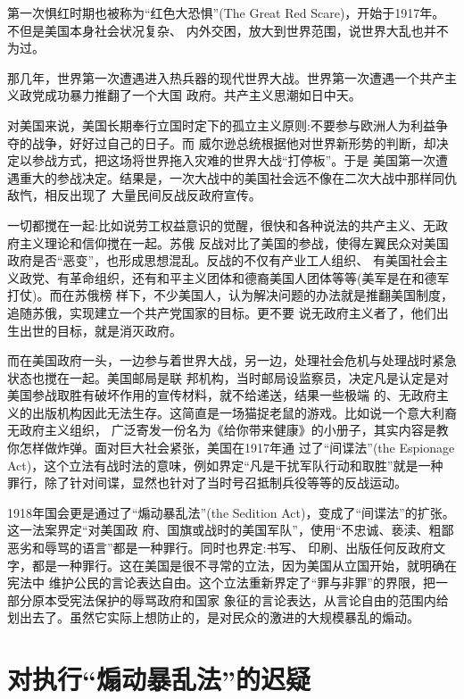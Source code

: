 \documentclass[10pt]{article}
\begin{document}
{第一次惧红时期也被称为``红色大恐惧''(The Great Red Scare)，开始于1917年。不但是美国本身社会状况复杂、
内外交困，放大到世界范围，说世界大乱也并不为过。

那几年，世界第一次遭遇进入热兵器的现代世界大战。世界第一次遭遇一个共产主义政党成功暴力推翻了一个大国
政府。共产主义思潮如日中天。

对美国来说，美国长期奉行立国时定下的孤立主义原则:不要参与欧洲人为利益争夺的战争，好好过自己的日子。而
威尔逊总统根据他对世界新形势的判断，却决定以参战方式，把这场将世界拖入灾难的世界大战``打停板''。于是
美国第一次遭遇重大的参战决定。结果是，一次大战中的美国社会远不像在二次大战中那样同仇敌忾，相反出现了
大量民间反战反政府宣传。

一切都搅在一起:比如说劳工权益意识的觉醒，很快和各种说法的共产主义、无政府主义理论和信仰搅在一起。苏俄
反战对比了美国的参战，使得左翼民众对美国政府是否``恶变''，也形成思想混乱。反战的不仅有产业工人组织、
有美国社会主义政党、有革命组织，还有和平主义团体和德裔美国人团体等等(美军是在和德军打仗)。而在苏俄榜
样下，不少美国人，认为解决问题的办法就是推翻美国制度，追随苏俄，实现建立一个共产党国家的目标。更不要
说无政府主义者了，他们出生出世的目标，就是消灭政府。

而在美国政府一头，一边参与着世界大战，另一边，处理社会危机与处理战时紧急状态也搅在一起。美国邮局是联
邦机构，当时邮局设监察员，决定凡是认定是对美国参战取胜有破坏作用的宣传材料，就不给递送，结果一些极端
的、无政府主义的出版机构因此无法生存。这简直是一场猫捉老鼠的游戏。比如说一个意大利裔无政府主义组织，
广泛寄发一份名为《给你带来健康》的小册子，其实内容是教你怎样做炸弹。面对巨大社会紧张，美国在1917年通
过了``间谍法''(the Espionage Act)，这个立法有战时法的意味，例如界定``凡是干扰军队行动和取胜''就是一种
罪行，除了针对间谍，显然也针对了当时号召抵制兵役等等的反战运动。

1918年国会更是通过了``煽动暴乱法''(the Sedition Act)，变成了``间谍法''的扩张。这一法案界定``对美国政
府、国旗或战时的美国军队''，使用``不忠诚、亵渎、粗鄙恶劣和辱骂的语言''都是一种罪行。同时也界定:书写、
印刷、出版任何反政府文字，都是一种罪行。这在美国是很不寻常的立法，因为美国从立国开始，就明确在宪法中
维护公民的言论表达自由。这个立法重新界定了``罪与非罪''的界限，把一部分原本受宪法保护的辱骂政府和国家
象征的言论表达，从言论自由的范围内给划出去了。虽然它实际上想防止的，是对民众的激进的大规模暴乱的煽动。


\pagebreak
\section{对执行``煽动暴乱法''的迟疑}

}
\end{document}
